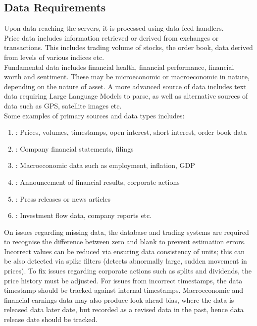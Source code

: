 \subsection{Data Requirements}

Upon data reaching the servers, it is processed using data feed handlers.\\

Price data includes information retrieved or derived from exchanges or transactions. This includes trading volume of stocks, the order book, data derived from levels of various indices etc.\\

Fundamental data includes financial health, financial performance, financial worth and sentiment. These may be microeconomic or macroeconomic in nature, depending on the nature of asset. A more advanced source of data includes text data requiring Large Language Models to parse, as well as alternative sources of data such as GPS, satellite images etc.\\

Some examples of primary sources and data types includes:
\begin{enumerate}[label=\roman*.]
\setlength{\itemsep}{0pt}
\item {}: Prices, volumes, timestamps, open interest, short interest, order book data
\item {}: Company financial statements, filings
\item {}: Macroeconomic data such as employment, inflation, GDP
\item {}: Announcement of financial results, corporate actions
\item {}: Press releases or news articles
\item {}: Investment flow data, company reports etc. 
\end{enumerate}

On issues regarding missing data, the database and trading systems are required to recognise the difference between zero and blank to prevent estimation errors. Incorrect values can be reduced via ensuring data consistency of units; this can be also detected via spike filters (detects abnormally large, sudden movement in prices). To fix issues regarding corporate actions such as splits and dividends, the price history must be adjusted. For issues from incorrect timestamps, the data timestamp should be tracked against internal timestamps. Macroeconomic and financial earnings data may also produce look-ahead bias, where the data is released data later date, but recorded as a revised data in the past, hence data release date should be tracked.

